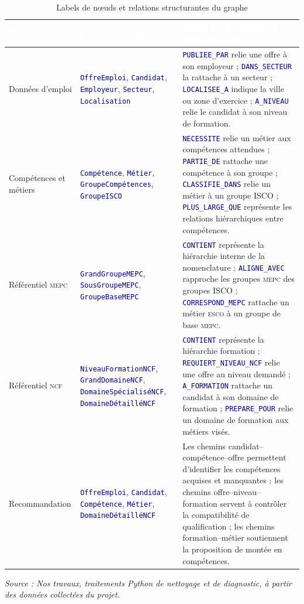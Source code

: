 \documentclass[12pt,twoside]{report}
\newcommand{\source}[1]{%
  \par\vspace{0.2\baselineskip}
  {\centering\footnotesize\itshape Source : #1\par}
}
\newcommand{\filevar}[1]{\texttt{\textcolor{darkblue}{#1}}}
\newcommand{\tabheader}[1]{\textcolor{white}{\textbf{#1}}}
\newcommand{\tableStyleStart}{%
  \small
  \renewcommand{\arraystretch}{1.12}%
  \setlength{\tabcolsep}{4pt}%
  \rowcolors{2}{lightblue!12}{white}%
}
\newcommand{\tableStyleEnd}{%
  \rowcolors{2}{}{}%
  \renewcommand{\arraystretch}{1}%
}
\newcommand{\ESCO}{\textsc{esco}}
\newcommand{\MEPC}{\textsc{mepc}}
\newcommand{\NCF}{\textsc{ncf}}
\begin{document}
\begin{table}[H]
	\centering
	\caption{Labels de nœuds et relations structurantes du graphe}
	\label{tab:labels_relations_graphe}
	\tableStyleStart
	\begin{tabularx}{\textwidth}{p{3.6cm}p{4.2cm}X}
		\rowcolor{darkblue}
		\tabheader{Bloc} & \tabheader{Labels de nœuds} & \tabheader{Relations principales et interprétation} \\
		\midrule
		Données d'emploi & \filevar{OffreEmploi}, \filevar{Candidat}, \filevar{Employeur}, \filevar{Secteur}, \filevar{Localisation} & \filevar{PUBLIEE\_PAR} relie une offre à son employeur ; \filevar{DANS\_SECTEUR} la rattache à un secteur ; \filevar{LOCALISEE\_A} indique la ville ou zone d'exercice ; \filevar{A\_NIVEAU} relie le candidat à son niveau de formation. \\
		Compétences et métiers & \filevar{Compétence}, \filevar{Métier}, \filevar{GroupeCompétences}, \filevar{GroupeISCO} & \filevar{NECESSITE} relie un métier aux compétences attendues ; \filevar{PARTIE\_DE} rattache une compétence à son groupe ; \filevar{CLASSIFIE\_DANS} relie un métier à un groupe ISCO ; \filevar{PLUS\_LARGE\_QUE} représente les relations hiérarchiques entre compétences. \\
		Référentiel \MEPC{} & \filevar{GrandGroupeMEPC}, \filevar{SousGroupeMEPC}, \filevar{GroupeBaseMEPC} & \filevar{CONTIENT} représente la hiérarchie interne de la nomenclature ; \filevar{ALIGNE\_AVEC} rapproche les groupes \MEPC{} des groupes ISCO ; \filevar{CORRESPOND\_MEPC} rattache un métier \ESCO{} à un groupe de base \MEPC{}. \\
		Référentiel \NCF{} & \filevar{NiveauFormationNCF}, \filevar{GrandDomaineNCF}, \filevar{DomaineSpécialiséNCF}, \filevar{DomaineDétailléNCF} & \filevar{CONTIENT} représente la hiérarchie formation ; \filevar{REQUIERT\_NIVEAU\_NCF} relie une offre au niveau demandé ; \filevar{A\_FORMATION} rattache un candidat à son domaine de formation ; \filevar{PREPARE\_POUR} relie un domaine de formation aux métiers visés. \\
		Recommandation & \filevar{OffreEmploi}, \filevar{Candidat}, \filevar{Compétence}, \filevar{Métier}, \filevar{DomaineDétailléNCF} & Les chemins candidat--compétence--offre permettent d'identifier les compétences acquises et manquantes ; les chemins offre--niveau--formation servent à contrôler la compatibilité de qualification ; les chemins formation--métier soutiennent la proposition de montée en compétences. \\
		\bottomrule
	\end{tabularx}
	\tableStyleEnd
	\source{Nos travaux, traitements Python de nettoyage et de diagnostic, à partir des données collectées du projet.}
\end{table}
\end{document}

